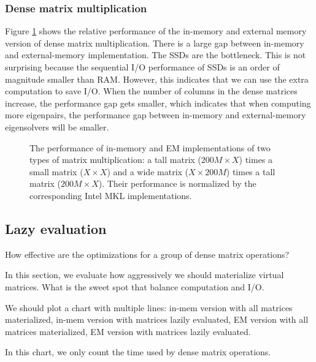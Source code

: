 \subsubsection{Dense matrix multiplication}

Figure \ref{perf:mat_mul} shows the relative performance of the in-memory
and external memory version of dense matrix multiplication.
There is a large gap between in-memory and external-memory implementation.
The SSDs are the bottleneck. This is not surprising because the sequential
I/O performance of SSDs is an order of magnitude smaller than RAM.
However, this indicates that we can use the extra computation to save I/O.
When the number of columns in the dense matrices increase, the performance
gap gets smaller, which indicates that when computing more eigenpairs,
the performance gap between in-memory and external-memory eigensolvers
will be smaller.

\begin{figure}
	\begin{center}
		\footnotesize
		\vspace{-15pt}
		
		\vspace{-15pt}
		\caption{The performance of in-memory and EM implementations of two types
			of matrix multiplication: a tall matrix ($200M \times X$) times
			a small matrix ($X \times X$) and a wide matrix ($X \times 200M$)
			times a tall matrix ($200M \times X$). Their performance is
		normalized by the corresponding Intel MKL implementations.}
		\label{perf:mat_mul}
	\end{center}
\end{figure}


\subsection{Lazy evaluation}
How effective are the optimizations for a group of dense matrix operations?

In this section, we evaluate how aggressively we should materialize virtual
matrices. What is the sweet spot that balance computation and I/O.

We should plot a chart with multiple lines:
in-mem version with all matrices materialized,
in-mem version with matrices lazily evaluated,
EM version with all matrices materialized,
EM version with matrices lazily evaluated.

In this chart, we only count the time used by dense matrix operations.

